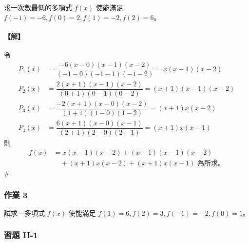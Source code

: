 \begin{example}\label{ex:b6s-2-3}
求一次數最低的多項式 $f(x)$ 使能滿足 $f(-1)=-6, f(0)=2, f(1)=-2, f(2)=6$。
\end{example}

\paragraph{【解】}
令
\begin{align*}
P_1(x) &= \dfrac{-6(x-0)(x-1)(x-2)}{(-1-0)(-1-1)(-1-2)} = x(x-1)(x-2) \\
P_2(x) &= \dfrac{2(x+1)(x-1)(x-2)}{(0+1)(0-1)(0-2)} = (x+1)(x-1)(x-2) \\
P_3(x) &= \dfrac{-2(x+1)(x-0)(x-2)}{(1+1)(1-0)(1-2)} = (x+1)x(x-2) \\
P_4(x) &= \dfrac{6(x+1)(x-0)(x-1)}{(2+1)(2-0)(2-1)} = (x+1)x(x-1)
\end{align*}
則
\begin{align*}
f(x) &= x(x-1)(x-2) + (x+1)(x-1)(x-2) \\
&\quad + (x+1)x(x-2) + (x+1)x(x-1) \text{ 為所求。}
\end{align*}
\hfill$\#$

\subsubsection*{作業 3}\label{hw:b6s-2-3}
試求一多項式 $f(x)$ 使能滿足 $f(1)=6, f(2)=3, f(-1)=-2, f(0)=1$。

\subsubsection*{習題 II-1}\label{sec:b6s-ex2-1}

